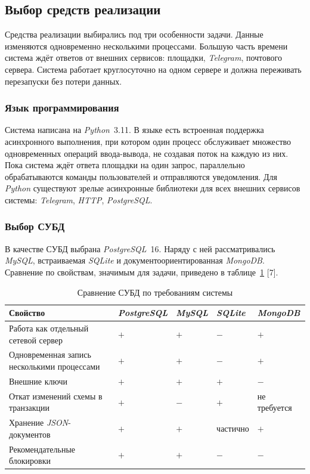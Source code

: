 \subsection{Выбор средств реализации}
\label{sec:development:tools}

Средства реализации выбирались под три особенности задачи. Данные изменяются одновременно несколькими процессами. Большую часть времени система ждёт ответов от внешних сервисов: площадки, \textit{Telegram}, почтового сервера. Система работает круглосуточно на одном сервере и должна переживать перезапуски без потери данных.

\subsubsection{Язык программирования}

Система написана на \textit{Python}~3.11. В языке есть встроенная поддержка асинхронного выполнения, при котором один процесс обслуживает множество одновременных операций ввода-вывода, не создавая поток на каждую из них. Пока система ждёт ответа площадки на один запрос, параллельно обрабатываются команды пользователей и отправляются уведомления. Для \textit{Python} существуют зрелые асинхронные библиотеки для всех внешних сервисов системы: \textit{Telegram}, \textit{HTTP}, \textit{PostgreSQL}.

\subsubsection{Выбор СУБД}

В качестве СУБД выбрана \textit{PostgreSQL}~16. Наряду с ней рассматривались \textit{MySQL}, встраиваемая \textit{SQLite} и документоориентированная \textit{MongoDB}. Сравнение по свойствам, значимым для задачи, приведено в таблице~\ref{table:development:dbms} [7].

\begin{table}[ht]
\caption{Сравнение СУБД по требованиям системы}
\label{table:development:dbms}
\centering
	\begin{tabular}{|>{\raggedright}m{}
	                |>{\centering}m{}
	                |>{\centering}m{}
	                |>{\centering}m{}
	                |>{\centering\arraybackslash}m{}|}
	\hline
	\centering Свойство & \textit{Post\-greSQL} & \textit{MySQL} & \textit{SQLite} & \textit{Mongo\-DB} \\
	\hline Работа как отдельный сетевой сервер & $+$ & $+$ & $-$ & $+$ \\
	\hline Одновременная запись несколькими процессами & $+$ & $+$ & $-$ & $+$ \\
	\hline Внешние ключи & $+$ & $+$ & $+$ & $-$ \\
	\hline Откат изменений схемы в транзакции & $+$ & $-$ & $+$ & не требуется \\
	\hline Хранение \textit{JSON}-документов & $+$ & $+$ & частично & $+$ \\
	\hline Рекомендательные блокировки & $+$ & $+$ & $-$ & $-$ \\
	\hline
	\end{tabular}
\end{table}

